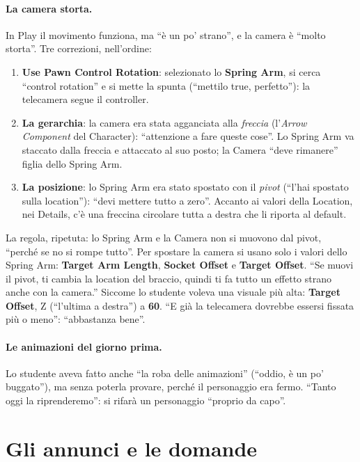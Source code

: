 \paragraph{La camera storta.} In Play il movimento funziona, ma ``è un po' strano'', e la
camera è ``molto storta''. Tre correzioni, nell'ordine:
\begin{enumerate}
  \item \textbf{Use Pawn Control Rotation}: selezionato lo \textbf{Spring Arm}, si cerca
        ``control rotation'' e si mette la spunta (``mettilo true, perfetto''): la
        telecamera segue il controller.
  \item \textbf{La gerarchia}: la camera era stata agganciata alla \emph{freccia}
        (l'\emph{Arrow Component} del Character): ``attenzione a fare queste cose''. Lo
        Spring Arm va staccato dalla freccia e attaccato al suo posto; la Camera ``deve
        rimanere'' figlia dello Spring Arm.
  \item \textbf{La posizione}: lo Spring Arm era stato spostato con il \emph{pivot}
        (``l'hai spostato sulla location''): ``devi mettere tutto a zero''. Accanto ai
        valori della Location, nei Details, c'è una freccina circolare tutta a destra che
        li riporta al default.
\end{enumerate}
La regola, ripetuta: lo Spring Arm e la Camera non si muovono dal pivot, ``perché se no
si rompe tutto''. Per spostare la camera si usano solo i valori dello Spring Arm:
\textbf{Target Arm Length}, \textbf{Socket Offset} e \textbf{Target Offset}. ``Se muovi
il pivot, ti cambia la location del braccio, quindi ti fa tutto un effetto strano anche
con la camera.'' Siccome lo studente voleva una visuale più alta: \textbf{Target Offset},
Z (``l'ultima a destra'') a \textbf{60}. ``E già la telecamera dovrebbe essersi fissata
più o meno'': ``abbastanza bene''.

\paragraph{Le animazioni del giorno prima.} Lo studente aveva fatto anche ``la roba delle
animazioni'' (``oddio, è un po' buggato''), ma senza poterla provare, perché il
personaggio era fermo. ``Tanto oggi la riprenderemo'': si rifarà un personaggio ``proprio
da capo''.

\section{Gli annunci e le domande}
\label{ue10:sec:annunci}

